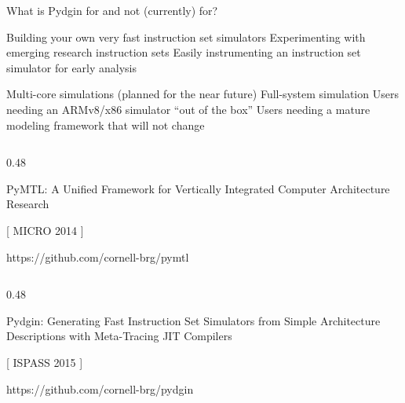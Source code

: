 \begin{frame}{What is Pydgin for and not (currently) for?}
\begin{cbxlist}

  \1 

     \2 Building your own very fast instruction set simulators
     \2 Experimenting with emerging research instruction sets
     \2 Easily instrumenting an instruction set simulator for early analysis

  \1 

     \2 Multi-core simulations (planned for the near future)
     \2 Full-system simulation
     \2 Users needing  an ARMv8/x86 simulator ``out of the box''
     \2 Users needing a mature modeling framework that will not change

\end{cbxlist}
\end{frame}

\begin{frame}

\vspace{0.5in}
\begin{cbxcols}

  \begin{column}{0.48\tw}
    \centering

    \vspace{0.215in}

    PyMTL: A Unified Framework for Vertically Integrated Computer
    Architecture Research

    \vspace{0.39in}
    [ MICRO 2014 ]

    \vspace{0.05in}
    \small{https://github.com/cornell-brg/pymtl}
  \end{column}

  \begin{column}{0.48\tw}
    \centering


    \vspace{0.25in}

    Pydgin: Generating Fast Instruction Set Simulators from Simple
    Architecture Descriptions with Meta-Tracing JIT Compilers

    \vspace{0.2in}
    [ ISPASS 2015 ]

    \vspace{0.05in}
    \small{https://github.com/cornell-brg/pydgin}

  \end{column}
\end{cbxcols}
\end{frame}


